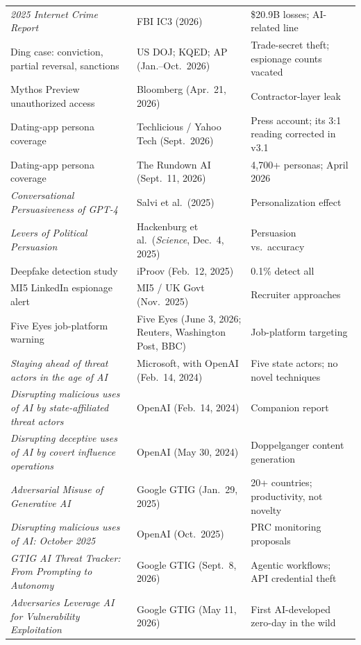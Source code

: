\documentclass[11pt,letterpaper]{article}
\begin{document}
{\begin{longtable}{L{6.4cm}L{4.4cm}L{5.2cm}}
\textit{2025 Internet Crime Report} & FBI IC3 (2026) & \$20.9B losses; AI-related line \\
Ding case: conviction, partial reversal, sanctions & US DOJ; KQED; AP (Jan.--Oct.\ 2026) & Trade-secret theft; espionage counts vacated \\
Mythos Preview unauthorized access & Bloomberg (Apr.\ 21, 2026) & Contractor-layer leak \\
Dating-app persona coverage & Techlicious / Yahoo Tech (Sept.\ 2026) & Press account; its 3:1 reading corrected in v3.1 \\
Dating-app persona coverage & The Rundown AI (Sept.\ 11, 2026) & 4,700+ personas; April 2026 \\
\textit{Conversational Persuasiveness of GPT-4} & Salvi et al.\ (2025) & Personalization effect \\
\textit{Levers of Political Persuasion} & Hackenburg et al.\ (\textit{Science}, Dec.\ 4, 2025) & Persuasion vs.\ accuracy \\
Deepfake detection study & iProov (Feb.\ 12, 2025) & 0.1\% detect all \\
MI5 LinkedIn espionage alert & MI5 / UK Govt (Nov.\ 2025) & Recruiter approaches \\*
Five Eyes job-platform warning & Five Eyes (June 3, 2026; Reuters, Washington Post, BBC) & Job-platform targeting \\
\textit{Staying ahead of threat actors in the age of AI} & Microsoft, with OpenAI (Feb.\ 14, 2024) & Five state actors; no novel techniques \\
\textit{Disrupting malicious uses of AI by state-affiliated threat actors} & OpenAI (Feb.\ 14, 2024) & Companion report \\
\textit{Disrupting deceptive uses of AI by covert influence operations} & OpenAI (May 30, 2024) & Doppelganger content generation \\
\textit{Adversarial Misuse of Generative AI} & Google GTIG (Jan.\ 29, 2025) & 20+ countries; productivity, not novelty \\
\textit{Disrupting malicious uses of AI: October 2025} & OpenAI (Oct.\ 2025) & PRC monitoring proposals \\
\textit{GTIG AI Threat Tracker: From Prompting to Autonomy} & Google GTIG (Sept.\ 8, 2026) & Agentic workflows; API credential theft \\
\textit{Adversaries Leverage AI for Vulnerability Exploitation} & Google GTIG (May 11, 2026) & First AI-developed zero-day in the wild \\

\end{longtable}}
\end{document}
